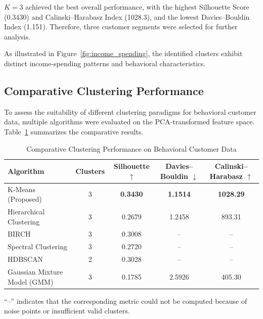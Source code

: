\documentclass[twoside]{article}
\begin{document}
$K=3$ achieved the best overall performance, with the highest Silhouette Score (0.3430) and Calinski--Harabasz Index (1028.3), and the lowest Davies–Bouldin Index (1.151). Therefore, three customer segments were selected for further analysis. 

As illustrated in Figure~\ref{fig:income_spending}, the identified clusters exhibit distinct income-spending patterns and behavioral characteristics.

\subsection{Comparative Clustering Performance}
To assess the suitability of different clustering paradigms for behavioral customer data, multiple algorithms were evaluated on the PCA-transformed feature space. Table~\ref{tab:clustering_comparison} summarizes the comparative results.

\begin{table}[htbp]
\centering
\caption{Comparative Clustering Performance on Behavioral Customer Data}
\label{tab:clustering_comparison}
\footnotesize
\renewcommand{\arraystretch}{1.1}
\begin{tabular}{lcccc}
\hline
\textbf{Algorithm} &
\textbf{Clusters} &
\textbf{Silhouette} $\uparrow$ &
\textbf{Davies--Bouldin} $\downarrow$ &
\textbf{Calinski--Harabasz} $\uparrow$ \\
\hline

K-Means (Proposed)
& 3
& \textbf{0.3430}
& \textbf{1.1514}
& \textbf{1028.29} \\

Hierarchical Clustering
& 3
& 0.2679
& 1.2458
& 893.31 \\

BIRCH
& 3
& 0.3008
& --
& -- \\

Spectral Clustering
& 3
& 0.2720
& --
& -- \\

HDBSCAN
& 2
& 0.3028
& --
& -- \\

Gaussian Mixture Model (GMM)
& 3
& 0.1785
& 2.5926
& 405.30 \\

\hline
\end{tabular}

\vspace{0.5em}
\footnotesize{``--'' indicates that the corresponding metric could not be computed because of noise points or insufficient valid clusters.}
\end{table}
\end{document}
